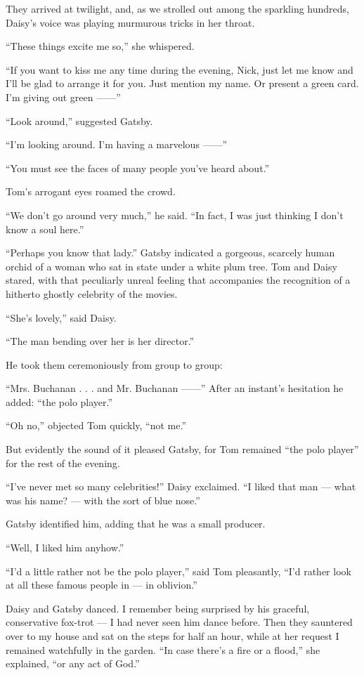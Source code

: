 \documentclass{znotebook}
\begin{document}
They arrived at twilight, and, as we strolled out among the sparkling hundreds, Daisy’s voice was playing murmurous tricks in her throat.

``These things excite me so,'' she whispered.

``If you want to kiss me any time during the evening, Nick, just let me know and I’ll be glad to arrange it for you. Just mention my name. Or present a green card. I’m giving out green ——''

``Look around,'' suggested Gatsby.

``I’m looking around. I’m having a marvelous ——''

``You must see the faces of many people you’ve heard about.''

Tom’s arrogant eyes roamed the crowd.

``We don’t go around very much,'' he said. ``In fact, I was just thinking I don’t know a soul here.''

``Perhaps you know that lady.'' Gatsby indicated a gorgeous, scarcely human orchid of a woman who sat in state under a white plum tree. Tom and Daisy stared, with that peculiarly unreal feeling that accompanies the recognition of a hitherto ghostly celebrity of the movies.

``She’s lovely,'' said Daisy.

``The man bending over her is her director.''

He took them ceremoniously from group to group:

``Mrs. Buchanan . . . and Mr. Buchanan ——'' After an instant’s hesitation he added: ``the polo player.''

``Oh no,'' objected Tom quickly, ``not me.''

But evidently the sound of it pleased Gatsby, for Tom remained ``the polo player'' for the rest of the evening.

``I’ve never met so many celebrities!'' Daisy exclaimed. ``I liked that man — what was his name? — with the sort of blue nose.''

Gatsby identified him, adding that he was a small producer.

``Well, I liked him anyhow.''

``I’d a little rather not be the polo player,'' said Tom pleasantly, ``I’d rather look at all these famous people in — in oblivion.''

Daisy and Gatsby danced. I remember being surprised by his graceful, conservative fox-trot — I had never seen him dance before. Then they sauntered over to my house and sat on the steps for half an hour, while at her request I remained watchfully in the garden. ``In case there’s a fire or a flood,'' she explained, ``or any act of God.''
\end{document}
